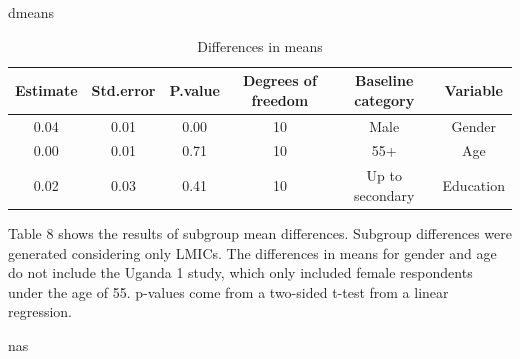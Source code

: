\documentclass[
  12pt,
]{article}
\newenvironment{Shaded}{\begin{snugshade}}{\end{snugshade}}
\newcommand{\NormalTok}[1]{#1}
\begin{document}
\pagebreak

\begin{Shaded}
\begin{Highlighting}[]
\NormalTok{dmeans}
\end{Highlighting}
\end{Shaded}

\begin{table}[!h]

\caption{\label{tab:dmeans}Differences in means}
\centering
\fontsize{10}{12}\selectfont
\begin{threeparttable}
\begin{tabular}[t]{cccccc}
\toprule
\textbf{Estimate} & \textbf{Std.error} & \textbf{P.value} & \textbf{Degrees of freedom} & \textbf{Baseline category} & \textbf{Variable}\\
\midrule
0.04 & 0.01 & 0.00 & 10 & Male & Gender\\
0.00 & 0.01 & 0.71 & 10 & 55+ & Age\\
0.02 & 0.03 & 0.41 & 10 & Up to secondary & Education\\
\bottomrule
\end{tabular}
\begin{tablenotes}
\item Table 8 shows the results of subgroup mean differences. Subgroup differences were generated considering only LMICs. The differences in means for gender and age do not include the Uganda 1 study, which only included female respondents under the age of 55. p-values come from a two-sided t-test from a linear regression.
\end{tablenotes}
\end{threeparttable}
\end{table}

\clearpage

\begin{Shaded}
\begin{Highlighting}[]
\NormalTok{nas}
\end{Highlighting}
\end{Shaded}
\end{document}
